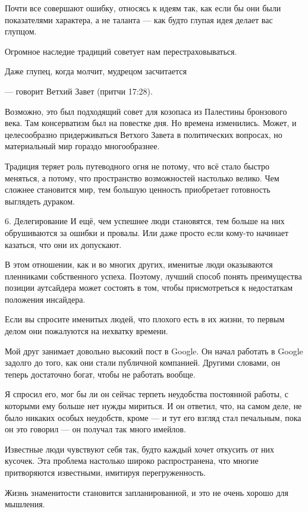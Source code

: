 \documentclass[ebook,12pt,oneside,openany]{memoir}
\begin{document}
Почти все совершают ошибку, относясь к идеям так, как если бы они были
показателями характера, а не таланта — как будто глупая идея делает
вас глупцом.

Огромное наследие традиций советует нам перестраховываться.

Даже глупец, когда молчит, мудрецом засчитается



— говорит Ветхий Завет (притчи 17:28).

Возможно, это был подходящий совет для козопаса из Палестины
бронзового века. Там консерватизм был на повестке дня. Но времена
изменились. Может, и целесообразно придерживаться Ветхого Завета в
политических вопросах, но материальный мир гораздо многообразнее.

Традиция теряет роль путеводного огня не потому, что всё стало быстро
меняться, а потому, что пространство возможностей настолько велико.
Чем сложнее становится мир, тем большую ценность приобретает
готовность выглядеть дураком.

6. Делегирование И ещё, чем успешнее люди становятся, тем больше на
них обрушиваются за ошибки и провалы. Или даже просто если кому-то
начинает казаться, что они их допускают.

В этом отношении, как и во многих других, именитые люди оказываются
пленниками собственного успеха. Поэтому, лучший способ понять
преимущества позиции аутсайдера может состоять в том, чтобы
присмотреться к недостаткам положения инсайдера.

Если вы спросите именитых людей, что плохого есть в их жизни, то
первым делом они пожалуются на нехватку времени.

Мой друг занимает довольно высокий пост в Google. Он начал работать в
Google задолго до того, как они стали публичной компанией. Другими
словами, он теперь достаточно богат, чтобы не работать вообще.

Я спросил его, мог бы ли он сейчас терпеть неудобства постоянной
работы, с которыми ему больше нет нужды мириться. И он ответил, что,
на самом деле, не было никаких особых неудобств, кроме — и тут его
взгляд стал печальным, пока он это говорил — он получал так много
имейлов.

Известные люди чувствуют себя так, будто каждый хочет откусить от них
кусочек. Эта проблема настолько широко распространена, что многие
притворяются известными, имитируя перегруженность.

Жизнь знаменитости становится запланированной, и это не очень хорошо
для мышления.
\end{document}
